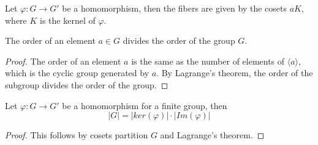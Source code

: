 Let $\varphi:G\to G'$ be a homomorphism, then the fibers are given by the cosets $aK$, where $K$ is the kernel of $\varphi$.

\begin{prop}
    The order of an element $a\in G$ divides the order of the group $G$.
\end{prop}
\begin{proof}
    The order of an element $a$ is the same as the number of elements of $\langle a\rangle$, which is the cyclic group generated by $a$. By Lagrange's theorem, the order of the subgroup divides the order of the group.
\end{proof}

\begin{prop}
    Let $\varphi:G\to G'$ be a homomorphism for a finite group, then 
    \begin{equation*}
        |G|=|ker(\varphi)|\cdot |Im(\varphi)|
    \end{equation*}
\end{prop}
\begin{proof}
    This follows by cosets partition $G$ and Lagrange's theorem.
\end{proof}




